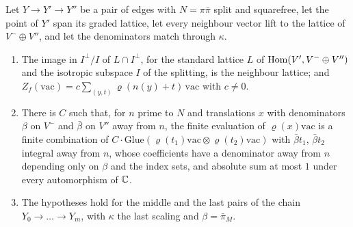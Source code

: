 \begin{theorem}\label{thm:finite-evaluation}
Let $Y\to Y'\to Y''$ be a pair of edges with $N=\pi\bar\pi$ split and squarefree, let the point of $Y'$ span its graded
lattice, let every neighbour vector lift to the lattice of $V^-\oplus V''$, and let the denominators match through $\kappa$.
\begin{enumerate}[label=\textup{(\alph*)}]
\item The image in $I^\perp/I$ of $L\cap I^\perp$, for the standard lattice $L$ of $\operatorname{Hom}(V',V^-\oplus V'')$ and the isotropic subspace
$I$ of the splitting, is the neighbour lattice; and $Z_f(\mathrm{vac})=c\sum_{(y,t)}\varrho(n(y)+t)\,\mathrm{vac}$ with $c\ne0$.
\item There is $C$ such that, for $n$ prime to $N$ and translations $x$ with denominators $\beta$ on $V^-$ and $\bar\beta$ on $V''$ away from
$n$, the finite evaluation of $\varrho(x)\mathrm{vac}$ is a finite combination of $C\cdot\mathrm{Glue}(\varrho(t_1)\mathrm{vac}\otimes\varrho(t_2)\mathrm{vac})$ with
$\bar\beta t_1$, $\bar\beta t_2$ integral away from $n$, whose coefficients have a denominator away from $n$ depending only on $\beta$
and the index sets, and absolute sum at most $1$ under every automorphism of $\mathbb{C}$.
\item The hypotheses hold for the middle and the last pairs of the chain $Y_0\to\dots\to Y_m$, with $\kappa$ the last scaling
and $\beta=\bar\pi_M$.
\end{enumerate}
\end{theorem}
